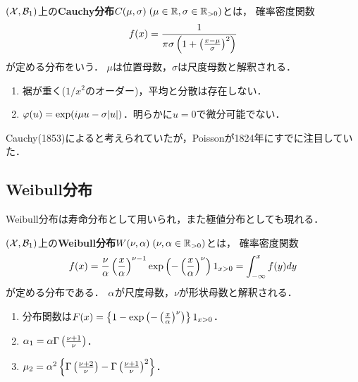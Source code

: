 \documentclass[uplatex,dvipdfmx]{jsreport}
\begin{document}
\begin{definition}
    $(\mathcal{X},\mathcal{B}_1)$上の\textbf{Cauchy分布}$C(\mu,\sigma)\;(\mu\in\mathbb{R},\sigma\in\mathbb{R}_{>0})$とは，
    確率密度関数
    \[f(x)=\frac{1}{\pi\sigma\left(1+\left(\frac{x-\mu}{\sigma}\right)^2\right)}\]
    が定める分布をいう．
    $\mu$は位置母数，$\sigma$は尺度母数と解釈される．
\end{definition}

\begin{proposition}\mbox{}
    \begin{enumerate}
        \item 裾が重く($1/x^2$のオーダー)，平均と分散は存在しない．
        \item $\varphi(u)=\exp(i\mu u-\sigma\lvert u\rvert)$．明らかに$u=0$で微分可能でない．
    \end{enumerate}
\end{proposition}

\begin{history}
    Cauchy(1853)によると考えられていたが，Poissonが1824年にすでに注目していた．
\end{history}

\subsection{Weibull分布}

\begin{tcolorbox}[colframe=ForestGreen, colback=ForestGreen!10!white,breakable,colbacktitle=ForestGreen!40!white,coltitle=black,fonttitle=\bfseries\sffamily,
title=]
    Weibull分布は寿命分布として用いられ，また極値分布としても現れる．
\end{tcolorbox}

\begin{definition}
    $(\mathcal{X},\mathcal{B}_1)$上の\textbf{Weibull分布}$W(\nu,\alpha)\;(\nu,\alpha\in\mathbb{R}_{>0})$とは，
    確率密度関数
    \[f(x)=\frac{\nu}{\alpha}\left(\frac{x}{\alpha}\right)^{\nu-1}\exp\left(-\left(\frac{x}{\alpha}\right)^\nu\right)1_{x>0}=\int^x_{-\infty}f(y)dy\]
    が定める分布である．
    $\alpha$が尺度母数，$\nu$が形状母数と解釈される．
\end{definition}

\begin{proposition}\mbox{}
    \begin{enumerate}
        \item 分布関数は$F(x)=\left\{1-\exp\left(-\left(\frac{x}{\alpha}\right)^\nu\right)\right\}1_{x>0}$．
        \item $\alpha_1=\alpha\Gamma\left(\frac{\nu+1}{\nu}\right)$．
        \item $\mu_2=\alpha^2\left\{\Gamma\left(\frac{\nu+2}{\nu}\right)-\Gamma\left(\frac{\nu+1}{\nu}\right)^2\right\}$．
    \end{enumerate}
\end{proposition}
\end{document}

